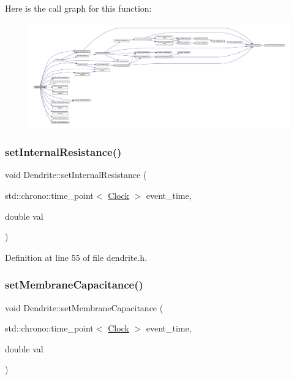 Here is the call graph for this function\+:
\nopagebreak
\begin{figure}[H]
\begin{center}
\leavevmode
\includegraphics[width=350pt]{class_dendrite_ad341dcd42c9d5d486be1e8268d8bca27_cgraph}
\end{center}
\end{figure}
\mbox{\label{class_dendrite_ac79018e356cec31be05518b85c73a54d}} 
\subsubsection{\texorpdfstring{set\+Internal\+Resistance()}{setInternalResistance()}}
{\footnotesize\ttfamily void Dendrite\+::set\+Internal\+Resistance (\begin{DoxyParamCaption}\item[{std\+::chrono\+::time\+\_\+point$<$ \hyperlink{universe_8h_a0ef8d951d1ca5ab3cfaf7ab4c7a6fd80}{Clock} $>$}]{event\+\_\+time,  }\item[{double}]{val }\end{DoxyParamCaption})\hspace{0.3cm}{\ttfamily [inline]}}



Definition at line 55 of file dendrite.\+h.

\mbox{\label{class_dendrite_a6fed149ffe00cf781a41a9f260f8eeb2}} 
\subsubsection{\texorpdfstring{set\+Membrane\+Capacitance()}{setMembraneCapacitance()}}
{\footnotesize\ttfamily void Dendrite\+::set\+Membrane\+Capacitance (\begin{DoxyParamCaption}\item[{std\+::chrono\+::time\+\_\+point$<$ \hyperlink{universe_8h_a0ef8d951d1ca5ab3cfaf7ab4c7a6fd80}{Clock} $>$}]{event\+\_\+time,  }\item[{double}]{val }\end{DoxyParamCaption})\hspace{0.3cm}{\ttfamily [inline]}}



